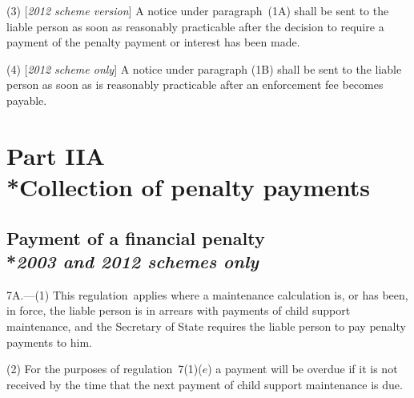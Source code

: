 \documentclass[12pt,a4paper]{article}
\begin{document}
(3) [\emph{2012 scheme version}] A notice under paragraph~(1A) shall be sent to the liable person as soon as reasonably practicable after the decision to require a payment of the penalty payment
or interest  %
has been made.

(4) [\emph{2012 scheme only}] A notice under paragraph (1B) shall be sent to the liable person as soon as is reasonably practicable after an enforcement fee becomes payable.


\section[Part IIA --- Collection of penalty payments]{Part IIA\\*Collection of penalty payments}

\renewcommand\parthead{--- Part IIA}

\subsection[7A. Payment of a financial penalty]{Payment of a financial penalty\\*\emph{2003 and 2012 schemes only}}

7A.---(1)  This regulation~applies where a maintenance calculation is, or has been, in force, the liable person is in arrears with payments of child support maintenance, and the Secretary of State requires the liable person to pay penalty payments to him.

(2) For the purposes of regulation~7(1)($e$)  a payment will be overdue if it is not received by the time that the next payment of child support maintenance is due.
\end{document}
